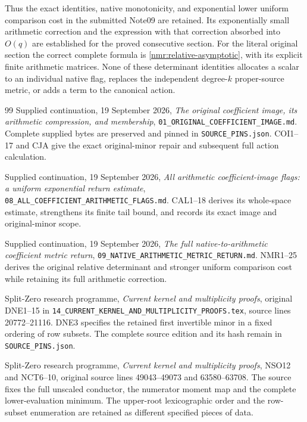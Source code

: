 Thus the exact identities, native monotonicity, and exponential lower
uniform comparison cost in the submitted Note09 are retained.
Its exponentially small arithmetic correction and the expression
with that correction absorbed into $O(q)$ are established for the
proved consecutive section. For the literal original section the
correct complete formula is \eqref{nmr:relative-asymptotic}, with
its explicit finite arithmetic matrices. None of these determinant identities allocates
a scalar to an individual native flag, replaces the independent
degree-$k$ proper-source metric, or adds a term to the canonical action.

\begin{thebibliography}{99}
Supplied continuation, 19 September 2026,
\emph{The original coefficient image, its arithmetic compression,
and membership}, \texttt{01\_ORIGINAL\_COEFFICIENT\_IMAGE.md}.
Complete supplied bytes are preserved and pinned in
\texttt{SOURCE\_PINS.json}. COI1--17 and CJA give the exact
original-minor repair and subsequent full action calculation.

Supplied continuation, 19 September 2026,
\emph{All arithmetic coefficient-image flags: a uniform exponential
return estimate}, \texttt{08\_ALL\_COEFFICIENT\_ARITHMETIC\_FLAGS.md}.
CAL1--18 derives its whole-space estimate, strengthens its finite
tail bound, and records its exact image and original-minor scope.

Supplied continuation, 19 September 2026,
\emph{The full native-to-arithmetic coefficient metric return},
\texttt{09\_NATIVE\_ARITHMETIC\_METRIC\_RETURN.md}.
NMR1--25 derives the original relative determinant and stronger
uniform comparison cost while retaining its full arithmetic correction.

Split-Zero research programme, \emph{Current kernel and multiplicity
proofs}, original DNE1--15 in
\texttt{14\_CURRENT\_KERNEL\_AND\_MULTIPLICITY\_PROOFS.tex},
source lines 20772--21116. DNE3 specifies the retained first
invertible minor in a fixed ordering of row subsets. The complete
source edition and its hash remain in \texttt{SOURCE\_PINS.json}.

Split-Zero research programme, \emph{Current kernel and multiplicity
proofs}, NSO12 and NCT6--10, original source lines 49043--49073
and 63580--63708. The source fixes the full unscaled conductor,
the numerator moment map and the complete lower-evaluation minimum.
The upper-root lexicographic order and the row-subset enumeration
are retained as different specified pieces of data.


\end{thebibliography}
